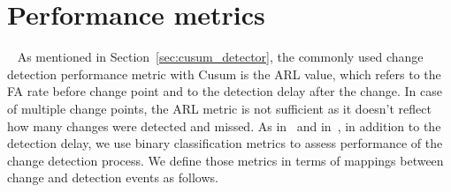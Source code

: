 \section{Performance metrics}~\label{sec:performance}
As mentioned in Section~\ref{sec:cusum_detector}, the commonly used change detection performance metric with Cusum is the ARL value, which refers to the FA rate before change point and to the detection delay after the change.
In case of multiple change points, the ARL metric is not sufficient as it doesn't reflect how many changes were detected and missed.
As in~\cite{bodenham2017continuous} and in~\cite{plasse2021streaming}, in addition to the detection delay, we use binary classification metrics to assess performance of the change detection process.
We define those metrics in terms of mappings between change and detection events as follows.
